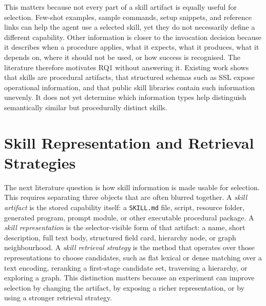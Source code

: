This matters because not every part of a skill artifact is equally useful for selection. Few-shot examples, sample commands, setup snippets, and reference links can help the agent use a selected skill, yet they do not necessarily define a different capability. Other information is closer to the invocation decision because it describes when a procedure applies, what it expects, what it produces, what it depends on, where it should not be used, or how success is recognised. The literature therefore motivates RQ1 without answering it. Existing work shows that skills are procedural artifacts, that structured schemas such as SSL expose operational information, and that public skill libraries contain such information unevenly. It does not yet determine which information types help distinguish semantically similar but procedurally distinct skills.

\section{Skill Representation and Retrieval Strategies}

The next literature question is how skill information is made usable for selection. This requires separating three objects that are often blurred together. A \emph{skill artifact} is the stored capability itself: a \texttt{SKILL.md} file, script, resource folder, generated program, prompt module, or other executable procedural package. A \emph{skill representation} is the selector-visible form of that artifact: a name, short description, full text body, structured field card, hierarchy node, or graph neighbourhood. A \emph{skill retrieval strategy} is the method that operates over those representations to choose candidates, such as flat lexical or dense matching over a text encoding, reranking a first-stage candidate set, traversing a hierarchy, or exploring a graph. This distinction matters because an experiment can improve selection by changing the artifact, by exposing a richer representation, or by using a stronger retrieval strategy.


